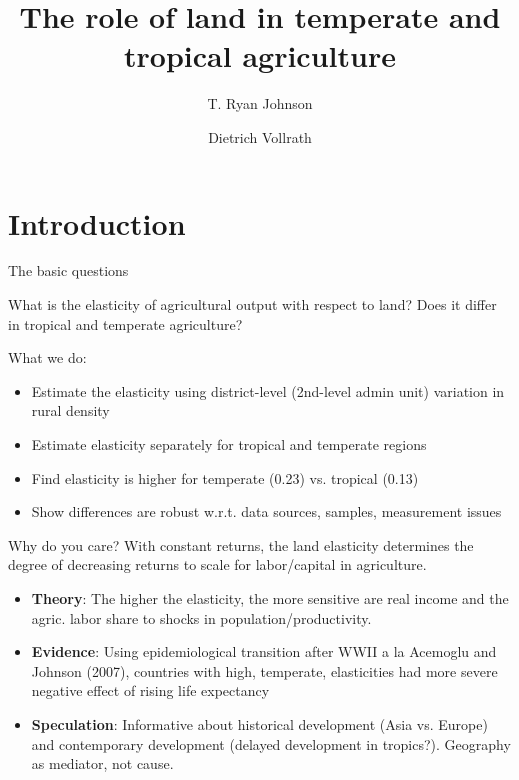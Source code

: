 \documentclass[10pt, xcolor=dvipsnames]{beamer}
\title[Land Constraints]{{The role of land in temperate and tropical agriculture}}
\author[Johnson \& Vollrath]{T. Ryan Johnson \inst{1} \and Dietrich Vollrath \inst{2}}
\institute[UH]{\inst{1} Washington University \and %
                      \inst{2} University of Houston}
\date[November 2018]{}
\begin{document}
\maketitle

\section{Introduction}

\begin{frame}{The basic questions}\label{define}

What is the elasticity of agricultural output with respect to land? Does it differ in tropical and temperate agriculture? 

\vspace{.25in}\noindent What we do: 
\begin{itemize}
  \item Estimate the elasticity using district-level (2nd-level admin unit) variation in rural density
  \item Estimate elasticity separately for tropical and temperate regions
  \item Find elasticity is higher for temperate (0.23) vs. tropical (0.13)
  \item Show differences are robust w.r.t. data sources, samples, measurement issues
\end{itemize}

\end{frame}


\begin{frame}{Why do you care?}
With constant returns, the land elasticity determines the degree of decreasing returns to scale for labor/capital in agriculture. 

\begin{itemize}
  \item \textbf{Theory}: The higher the elasticity, the more sensitive are real income and the agric. labor share to shocks in population/productivity.
  \item \textbf{Evidence}: Using epidemiological transition after WWII a la Acemoglu and Johnson (2007), countries with high, temperate, elasticities had more severe negative effect of rising life expectancy
  \item \textbf{Speculation}: Informative about historical development (Asia vs. Europe) and contemporary development (delayed development in tropics?). Geography as mediator, not cause.
\end{itemize}

\end{frame}
\end{document}
